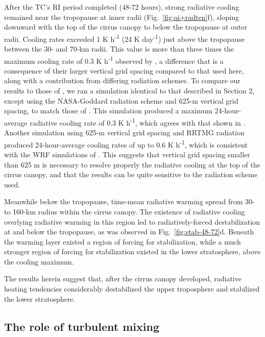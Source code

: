 \documentclass{ametsoc}
\begin{document}
After the TC's RI period completed (48-72 hours), strong radiative cooling remained near the tropopause at inner radii (Fig.~\ref{fig:qi+radten}f), sloping downward with the top of the cirrus canopy to below the tropopause at outer radii.
Cooling rates exceeded 1 K h\textsuperscript{-1} (24 K day\textsuperscript{-1}) just above the tropopause between the 30- and 70-km radii.
This value is more than three times the maximum cooling rate of 0.3 K h\textsuperscript{-1} observed by \cite{buetal}, a difference that is a consequence of their larger vertical grid spacing compared to that used here, along with a contribution from differing radiation schemes.
To compare our results to those of \cite{buetal}, we ran a simulation identical to that described in Section 2, except using the NASA-Goddard radiation scheme and 625-m vertical grid spacing, to match those of \cite{buetal}.
This simulation produced a maximum 24-hour-average radiative cooling rate of 0.3 K h\textsuperscript{-1}, which agrees with that shown in \cite{buetal}.
Another simulation using 625-m vertical grid spacing and RRTMG radiation produced 24-hour-average cooling rates of up to 0.6 K h\textsuperscript{-1}, which is consistent with the WRF simulations of \cite{buetal}.
This suggests that vertical grid spacing smaller than 625 m is necessary to resolve properly the radiative cooling at the top of the cirrus canopy, and that the results can be quite sensitive to the radiation scheme used.

Meanwhile below the tropopause, time-mean radiative warming spread from 30- to 160-km radius within the cirrus canopy.
The existence of radiative cooling overlying radiative warming in this region led to radiatively-forced destabilization at and below the tropopause, as was observed in Fig.~\ref{fig:stab-48-72}d.
Beneath the warming layer existed a region of forcing for stabilization, while a much stronger region of forcing for stabilization existed in the lower stratosphere, above the cooling maximum.

The results herein suggest that, after the cirrus canopy developed, radiative heating tendencies considerably destabilized the upper troposphere and stabilized the lower stratosphere.

  \subsection{The role of turbulent mixing}
\end{document}
